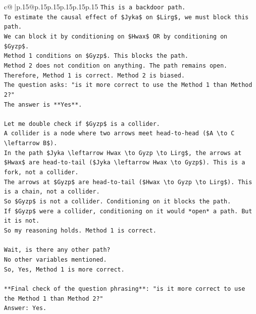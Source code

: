 \documentclass{article}
\begin{document}
{\begin{supertabular}{c@{$\;$}|p{.15\linewidth}@{}p{.15\linewidth}p{.15\linewidth}p{.15\linewidth}p{.15\linewidth}p{.15\linewidth}}
{{{\texttt{This is a backdoor path.} \\
\texttt{To estimate the causal effect of \$Jyka\$ on \$Lirg\$, we must block this path.} \\
\texttt{We can block it by conditioning on \$Hwax\$ OR by conditioning on \$Gyzp\$.} \\
\texttt{Method 1 conditions on \$Gyzp\$. This blocks the path.} \\
\texttt{Method 2 does not condition on anything. The path remains open.} \\
\texttt{Therefore, Method 1 is correct. Method 2 is biased.} \\
\texttt{The question asks: "is it more correct to use the Method 1 than Method 2?"} \\
\texttt{The answer is **Yes**.} \\
\\ 
\texttt{Let me double check if \$Gyzp\$ is a collider.} \\
\texttt{A collider is a node where two arrows meet head{-}to{-}head (\$A \textbackslash{}to C \textbackslash{}leftarrow B\$).} \\
\texttt{In the path \$Jyka \textbackslash{}leftarrow Hwax \textbackslash{}to Gyzp \textbackslash{}to Lirg\$, the arrows at \$Hwax\$ are head{-}to{-}tail (\$Jyka \textbackslash{}leftarrow Hwax \textbackslash{}to Gyzp\$). This is a fork, not a collider.} \\
\texttt{The arrows at \$Gyzp\$ are head{-}to{-}tail (\$Hwax \textbackslash{}to Gyzp \textbackslash{}to Lirg\$). This is a chain, not a collider.} \\
\texttt{So \$Gyzp\$ is not a collider. Conditioning on it blocks the path.} \\
\texttt{If \$Gyzp\$ were a collider, conditioning on it would *open* a path. But it is not.} \\
\texttt{So my reasoning holds. Method 1 is correct.} \\
\\ 
\texttt{Wait, is there any other path?} \\
\texttt{No other variables mentioned.} \\
\texttt{So, Yes, Method 1 is more correct.} \\
\\ 
\texttt{**Final check of the question phrasing**: "is it more correct to use the Method 1 than Method 2?"} \\
\texttt{Answer: Yes.} \\
\\ 
}}}
\end{supertabular}}
\end{document}
